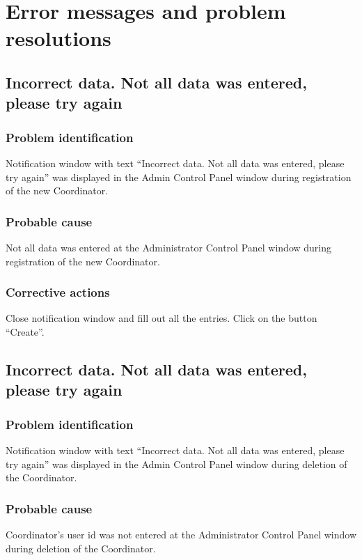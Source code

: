 \chapter{Error messages and problem resolutions}
\label{chap:error_messages}
\section{Incorrect data. Not all data was entered, please try again}

\subsection{Problem identification}
Notification window with text ``Incorrect data. Not all data was entered, please
try again'' was displayed in the Admin Control Panel window during registration
of the new Coordinator.

\subsection{Probable cause}
Not all data was entered at the Administrator Control Panel window during
registration of the new Coordinator.

\subsection{Corrective actions}
Close notification window and fill out all the entries. Click on the button
``Create''.

\section{Incorrect data. Not all data was entered, please try again}

\subsection{Problem identification}
Notification window with text ``Incorrect data. Not all data was entered, please
try again'' was displayed in the Admin Control Panel window during deletion
of the Coordinator.

\subsection{Probable cause}
Coordinator's user id was not entered at the Administrator Control Panel window
during deletion of the Coordinator.

